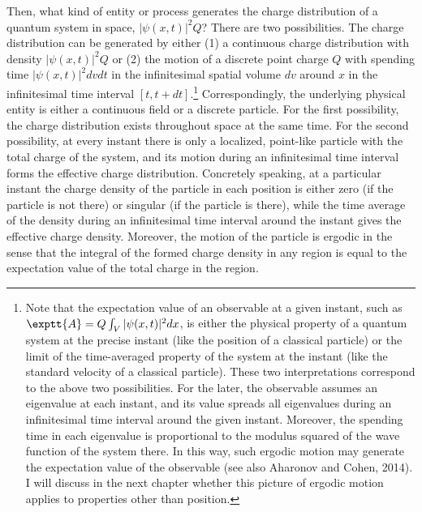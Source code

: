 Then, what kind of entity or process generates the charge distribution of a quantum system in space, $|\psi(x,t)|^2Q$?
There are two possibilities. The  charge distribution can be generated by either (1) a continuous charge distribution with density $|\psi(x,t)|^2Q$ or (2) the motion of a discrete point charge $Q$ with spending time $|\psi(x,t)|^2dvdt$ in the infinitesimal spatial volume $dv$ around $x$ in the infinitesimal time interval $[t,t+dt]$.\footnote{Note that the expectation value of an observable at a given instant, such as $\exptt{A} = {Q}\int_{V}|\psi(x,t)|^2 dx$, is either the physical property of a quantum system at the precise instant (like the position of a classical particle) or the limit of the time-averaged property of the system at the instant (like the standard velocity of a classical particle). These two interpretations correspond to the above two possibilities. For the later, the observable assumes an eigenvalue at each instant, and its value spreads all eigenvalues during an infinitesimal time interval around the given instant. Moreover, the spending time in each eigenvalue is proportional to the modulus squared of the wave function of the system there. In this way, such ergodic motion may generate the expectation value of the observable (see also Aharonov and Cohen, 2014). I will discuss in the next chapter whether this picture of ergodic motion applies to properties other than position.} Correspondingly, the underlying physical entity is either a continuous field or a discrete particle. %
For the first possibility, the charge distribution exists throughout space at the same time. For the second possibility, at every instant there is only a localized, point-like particle with the total charge of the system, and its motion during an infinitesimal time interval forms the effective charge distribution. Concretely speaking, at a particular instant the charge density of the particle in each position is either zero (if the particle is not there) or singular (if the particle is there), while the time average of the density during an infinitesimal time interval around the instant gives the effective charge density. Moreover, the motion of the particle is ergodic in the sense that the integral of the formed charge density in any region is equal to the expectation value of the total charge in the region.

